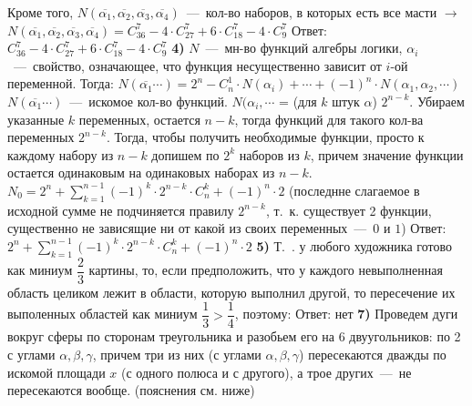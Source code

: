 \documentclass[12pt,a4paper,fleqn]{article}
\begin{document}
Кроме того, $N(\overline{\alpha_1},\overline{\alpha_2},\overline{\alpha_3},\overline{\alpha_4})$~---~кол-во наборов, в которых есть все масти $\rightarrow$ \newline
$N(\overline{\alpha_1},\overline{\alpha_2},\overline{\alpha_3},\overline{\alpha_4}) = C_{36}^7 - 4 \cdot C_{27}^7 + 6 \cdot C_{18}^7 - 4 \cdot C_9^7$ \newline
Ответ:$C_{36}^7 - 4 \cdot C_{27}^7 + 6 \cdot C_{18}^7 - 4 \cdot C_9^7$ \newline \newline
{\bf 4)} $N$~---~мн-во функций алгебры логики, $\alpha_i$~---~свойство, означающее, что функция несущественно зависит от $i$-ой переменной. Тогда: \newline
$N(\overline{\alpha_1} \cdots) = 2^n - C_n^1 \cdot N(\alpha_i) + \cdots + (-1)^n \cdot N (\alpha_1, \alpha_2, \cdots)$ \newline
$N(\overline{\alpha_1} \cdots)$~---~искомое кол-во функций. \newline
$N(\alpha_i, \cdots$ = (для $k$ штук $\alpha$) $2^{n - k}$. Убираем указанные $k$ переменных, остается $n - k$, тогда функций для такого кол-ва переменных $2^{n - k}$. Тогда, чтобы получить необходимые функции, просто к каждому набору из $n - k$ допишем по $2^k$ наборов из $k$, причем значение функции остается одинаковым на одинаковых наборах из $n - k$. \newline
$N_0 = 2^n + \sum_{k = 1}^{n - 1} (-1)^k \cdot 2^{n - k} \cdot C_n^k + (-1)^n \cdot 2$ (последнне слагаемое в исходной сумме не подчиняется правилу $2^{n - k}$, т.~к. существует 2 функции, существенно не зависящие ни от какой из своих переменных~---~$0$ и $1$) \newline
Ответ: $2^n + \sum_{k = 1}^{n - 1} (-1)^k \cdot 2^{n - k} \cdot C_n^k + (-1)^n \cdot 2$ \newline \newline
{\bf 5)} Т.~. у любого художника готово как миниум $\dfrac{2}{3}$ картины, то, если предположить, что у каждого невыполненная область целиком лежит в области, которую выполнил другой, то пересечение их выполенных областей как миниум $\dfrac{1}{3} > \dfrac{1}{4}$, поэтому: \newline
Ответ: нет \newline \newline
{\bf 7)} Проведем дуги вокруг сферы по сторонам треугольника и разобьем его на 6 двуугольников: по 2 с углами $\alpha, \beta, \gamma$, причем три из них (с углами $\alpha, \beta, \gamma$) пересекаются дважды по искомой площади $x$ (с одного полюса и с другого), а трое других~---~не пересекаются вообще. (пояснения см. ниже)\newline
\end{document}
